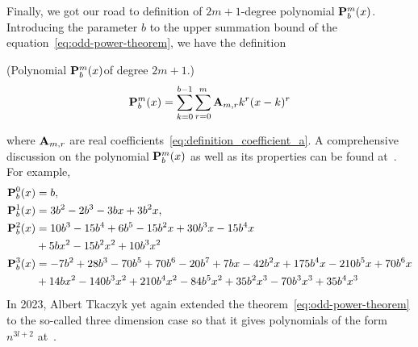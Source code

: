 

Finally, we got our road to definition of $2m+1$-degree polynomial ${\mathbf{P}}\sp{m} \sb{b}(x)$.
Introducing the parameter $b$ to the upper summation bound of the equation~\eqref{eq:odd-power-theorem},
we have the definition
\begin{defn} (Polynomial ${\mathbf{P}}\sp{m} \sb{b}(x) $of degree $2m+1$.)
    \begin{equation}
        {\mathbf{P}}\sp{m} \sb{b}(x) = \sum_{k=0}^{b-1} \sum_{r=0}^{m} {\mathbf{A}} \sb{m,r} k^r(x-k)^r
        \label{eq:definition_polynomial_p}
    \end{equation}
\end{defn}
where ${\mathbf{A}} \sb{m,r}$ are real coefficients~\eqref{eq:definition_coefficient_a}.
A comprehensive discussion on the polynomial ${\mathbf{P}}\sp{m} \sb{b}(x)$ as well as its properties can be found at~\cite{on_the_link_between_binomial_theorem_and_discrete_convolution}.
For example,
\begin{align*}
    {\mathbf{P}}\sp{0} \sb{b}(x)
    &=b, \\
    {\mathbf{P}}\sp{1} \sb{b}(x)
    &=3 b^2 - 2 b^3 - 3 b x + 3 b^2 x, \\
    {\mathbf{P}}\sp{2} \sb{b}(x)
    &=10 b^3 - 15 b^4 + 6 b^5 - 15 b^2 x + 30 b^3 x - 15 b^4 x \\
    &+ 5 b x^2 - 15 b^2 x^2 + 10 b^3 x^2 \\
    {\mathbf{P}}\sp{3} \sb{b}(x)
    &=-7 b^2 + 28 b^3 - 70 b^5 + 70 b^6 - 20 b^7 + 7 b x - 42 b^2 x + 175 b^4 x - 210 b^5 x + 70 b^6 x \\
    &+ 14 b x^2 - 140 b^3 x^2 + 210 b^4 x^2 - 84 b^5 x^2 + 35 b^2 x^3 - 70 b^3 x^3 + 35 b^4 x^3
\end{align*}
In 2023, Albert Tkaczyk yet again extended the theorem~\eqref{eq:odd-power-theorem} to the so-called three dimension case
so that it gives polynomials of the form $n^{3l+2}$ at~\cite{albert_tkaczyk_2023_8371454}.
